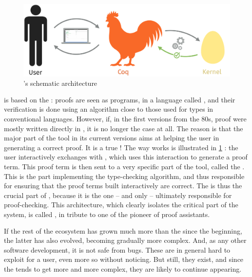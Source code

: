 \begin{figure}[h]

  \centering
  \includegraphics{./figures/coq-kernel-en.pdf}

  \caption{’s schematic architecture}
  \label{fig:coq-en}
\end{figure}

 is based on the : proofs are seen as programs,
in a language called , and their verification is done using an algorithm
close to those used for types in conventional languages. However, if, in the first versions
from the 80s,  proof were mostly written directly in , it is
no longer the case at all. The reason is that the major part of the tool in its
current versions aims at helping the user in generating a correct proof. It is a true
!
The way  works is illustrated in \cref{fig:coq-en} : the user interactively exchanges
with , which uses this interaction to generate a proof term. This proof term is then
sent to a very specific part of the tool, called the .
This is the part implementing the type-checking algorithm, and thus responsible for ensuring
that the proof terms built interactively are correct.
The  is thus the crucial part of , because it is the one – and only –
ultimately responsible for proof-checking.
This architecture, which clearly isolates the critical part of the system, is called
 , in tribute to one of the pioneer
of proof assistants.

If the rest of the ecosystem has grown much more than the  since the beginning,
the latter has also evolved, becoming gradually more complex.
And, as any other software development, it is not safe from bugs.%
These are in general hard to exploit for a user, even more so without noticing.
But still, they exist, and since the  tends to get more and more complex, they
are likely to continue appearing.

